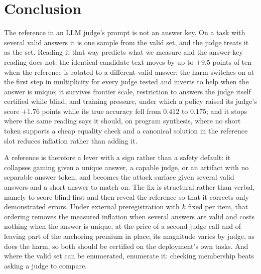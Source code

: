 \documentclass[11pt]{article}
\begin{document}
\section{Conclusion}

The reference in an LLM judge's prompt is not an answer key.
On a task with several valid answers it is one sample from the valid set, and the judge treats it as the set.
Reading it that way predicts what we measure and the answer-key reading does not: the identical candidate text moves by up to $+9.5$ points of ten when the reference is rotated to a different valid answer; the harm switches on at the first step in multiplicity for every judge tested and inverts to help when the answer is unique; it survives frontier scale, restriction to answers the judge itself certified while blind, and training pressure, under which a policy raised its judge's score $+1.76$ points while its true accuracy fell from $0.412$ to $0.175$; and it stops where the same reading says it should, on program synthesis, where no short token supports a cheap equality check and a canonical solution in the reference slot reduces inflation rather than adding it.

A reference is therefore a lever with a sign rather than a safety default: it collapses gaming given a unique answer, a capable judge, or an artifact with no separable answer token, and becomes the attack surface given several valid answers and a short answer to match on.
The fix is structural rather than verbal, namely to score blind first and then reveal the reference so that it corrects only demonstrated errors.
Under external preregistration with $k$ fixed per item, that ordering removes the measured inflation when several answers are valid and costs nothing when the answer is unique, at the price of a second judge call and of leaving part of the anchoring premium in place; its magnitude varies by judge, as does the harm, so both should be certified on the deployment's own tasks.
And where the valid set can be enumerated, enumerate it: checking membership beats asking a judge to compare.

\enlargethispage{4\baselineskip}
{\small


}
\end{document}
